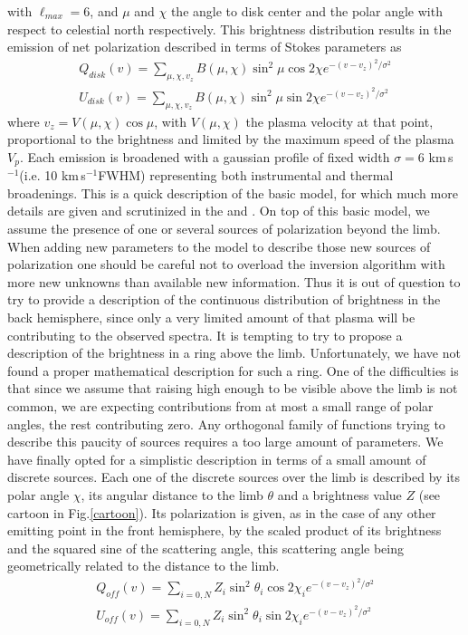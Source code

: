 \documentclass{/Users/art2/TeX/aanda/aa}
\def\kms {km\,s$^{-1}$}
\begin{document}
with $\ell_{max}=6$, and $\mu$ and $\chi$ the angle to disk center and the polar angle with respect to celestial north respectively. This brightness distribution results in the emission of net polarization described in terms of Stokes parameters as
\begin{eqnarray}
Q_{disk}(v)=\sum_{\mu,\chi,v_z} B(\mu,\chi) \sin^2 \mu \cos 2\chi e^{-(v-v_z)^2/\sigma^2}\\
U_{disk}(v)=\sum_{\mu,\chi,v_z} B(\mu,\chi) \sin^2 \mu \sin 2\chi e^{-(v-v_z)^2/\sigma^2}
\label{QU}
\end{eqnarray}
where $v_z=V(\mu, \chi) \cos \mu$, with $V(\mu, \chi)$ the plasma velocity at that point, proportional to the brightness and  limited by the maximum speed of the plasma $V_p$. Each emission is broadened with a gaussian profile of fixed width $\sigma=6$ \kms  (i.e. 10 \kms FWHM) representing both instrumental and thermal broadenings.
This is a quick description of the basic model, for which much more details are given and scrutinized in the \cite{LA18} and \cite{LA22}.
On top of  this basic model, we assume the presence of one or several sources of polarization beyond the limb. When adding new parameters to the model to describe those new sources of polarization one should be careful not to overload the inversion algorithm with more new unknowns than available new information. Thus it is out of question to try to provide a description of the continuous distribution of brightness in the back hemisphere, since only a very limited amount of that plasma will be contributing to the observed spectra. It is tempting to try to propose a description of the brightness in a ring above the limb.  Unfortunately, we have not found a proper mathematical description for such a ring. One of the difficulties is that since we assume that raising high enough to be visible above the limb is not common, we are expecting contributions from at most a small range of polar angles, the rest contributing zero. Any orthogonal family of functions trying to describe this paucity of sources requires a too large amount of parameters. We have finally opted for a simplistic description in terms of a small amount of discrete sources. Each one of the discrete sources over the limb is described by its polar angle $\chi$, its angular distance to the limb $\theta$ and a brightness value $Z$ (see cartoon in Fig.\ref{cartoon}). Its polarization is given, as in the case of any other emitting point in the front hemisphere, by the scaled product of its brightness and the squared sine of the scattering angle, this scattering angle being geometrically related to the distance to the limb.
\begin{eqnarray}
Q_{\mathit{off}}(v)=\sum_{i=0,N} Z_i \sin^2 \theta_i \cos 2\chi_i e^{-(v-v_z)^2/\sigma^2}\\
U_{\mathit{off}}(v)= \sum_{i=0,N} Z_i \sin^2 \theta_i \sin 2\chi_i e^{-(v-v_z)^2/\sigma^2}
\label{QU_off}
\end{eqnarray}
\end{document}
